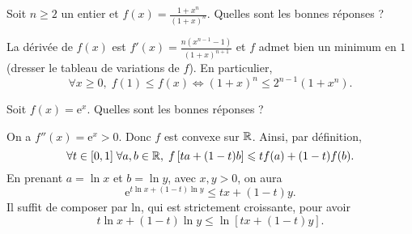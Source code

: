 \begin{question}
Soit $n\geq 2$ un entier et $\displaystyle f(x)=\frac{1+x^n}{(1+x)^n}$. Quelles sont les bonnes réponses ?
\begin{answers}  
\end{answers}
\begin{explanations}
La dérivée de $f(x)$ est $\displaystyle f'(x)=\frac{n(x^{n-1}-1)}{(1+x)^{n+1}}$ et $f$ admet bien un minimum en $1$ (dresser le tableau de variations de $f$). En particulier,
$$\forall x\geq 0,\; f(1)\leq f(x)\Leftrightarrow (1+x)^n\leq 2^{n-1}(1+x^n).$$
\end{explanations}
\end{question}



\begin{question}
Soit $f(x)=\mathrm{e}^x$. Quelles sont les bonnes réponses ?
\begin{answers}  
\end{answers}
\begin{explanations}
On a $f''(x)=\mathrm{e}^x>0$. Donc $f$ est convexe sur $\mathbb{R}$. Ainsi, par définition,
$$\forall t\in [0,1]\; \forall a,b\in \mathbb{R},\; f\left[ta+(1-t)b\right]\leqslant tf(a)+(1-t)f(b).$$
En prenant $a=\ln x$ et $b=\ln y$, avec $x,y>0$, on aura
$$\mathrm{e}^{t\ln x+(1-t)\ln y}\leq tx+(1-t)y.$$
Il suffit de composer par ln, qui est strictement croissante, pour avoir
$$t\ln x+(1-t)\ln y\leq \ln \left[tx+(1-t)y\right].$$
\end{explanations}
\end{question}


